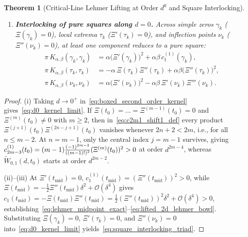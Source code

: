 \documentclass[11pt,reqno]{amsart}
\newtheorem{theorem}{Theorem}[section]
\theoremstyle{definition}
\theoremstyle{remark}
\numberwithin{equation}{section}
\newcommand{\fac}{\mathclose{\mathchar"0021}}
\begin{document}
\begin{theorem}[Critical-Line Lehmer Lifting at Order $d^0$ and Square Interlocking]
\begin{enumerate}[label=\textup{(\roman*)},leftmargin=2.2em]
\begin{equation}
\end{equation}
\item \textbf{Interlocking of pure squares along $d = 0$.} Across simple zeros $\gamma_k$ ($\Xi(\gamma_k) = 0$), local extrema $\tau_k$ ($\Xi'(\tau_k) = 0$), and inflection points $\nu_k$ ($\Xi''(\nu_k) = 0$), at least one component reduces to a pure square:
\begin{equation}\label{eq:square_interlocking_triad}
\begin{aligned}
\pi\,K_{\alpha,\beta}(\gamma_k, \gamma_k) &= \alpha\bigl(\Xi'(\gamma_k)\bigr)^2 + \alpha\beta\,c_1^{(1)}(\gamma_k), \\
\pi\,K_{\alpha,\beta}(\tau_k, \tau_k) &= -\alpha\,\Xi(\tau_k)\Xi''(\tau_k) + \alpha\beta\bigl(\Xi''(\tau_k)\bigr)^2, \\
\pi\,K_{\alpha,\beta}(\nu_k, \nu_k) &= \alpha\bigl(\Xi'(\nu_k)\bigr)^2 - \alpha\beta\,\Xi'(\nu_k)\Xi'''(\nu_k).
\end{aligned}
\end{equation}
\end{enumerate}
\end{theorem}

\begin{proof}
(i) Taking $d \to 0^+$ in~\eqref{eq:boxed_second_order_kernel} gives~\eqref{eq:d0_kernel_limit}. If $\Xi(t_0) = \dots = \Xi^{(m-1)}(t_0) = 0$ and $\Xi^{(m)}(t_0) \neq 0$ with $m \ge 2$, then in~\eqref{eq:c2m1_shift1_def} every product $\Xi^{(j+1)}(t_0)\Xi^{(2n-j+1)}(t_0)$ vanishes whenever $2n + 2 < 2m$, i.e., for all $n \le m - 2$. At $n = m - 1$, only the central index $j = m - 1$ survives, giving $c_{2m-3}^{(1)}(t_0) = (m-1)\frac{(-1)^{2m-2}}{((m-1)\fac)^2}(\Xi^{(m)}(t_0))^2 > 0$ at order $d^{2m-4}$, whereas $\widetilde{W}_{0,1}(d,t_0)$ starts at order $d^{2m-2}$.

(ii)--(iii) At $\Xi'(t_{\mathrm{mid}}) = 0$, $c_1^{(1)}(t_{\mathrm{mid}}) = (\Xi''(t_{\mathrm{mid}}))^2 > 0$, while $\Xi(t_{\mathrm{mid}}) = -\frac{1}{2}\Xi''(t_{\mathrm{mid}})\delta^2 + \mathcal{O}(\delta^4)$ gives $c_1(t_{\mathrm{mid}}) = -\Xi(t_{\mathrm{mid}})\Xi''(t_{\mathrm{mid}}) = \frac{1}{2}(\Xi''(t_{\mathrm{mid}}))^2\delta^2 + \mathcal{O}(\delta^4) > 0$, establishing~\eqref{eq:lehmer_midpoint_exact}--\eqref{eq:lifted_2d_lehmer_bowl}. Substituting $\Xi(\gamma_k)=0$, $\Xi'(\tau_k)=0$, and $\Xi''(\nu_k)=0$ into~\eqref{eq:d0_kernel_limit} yields~\eqref{eq:square_interlocking_triad}.
\end{proof}
\end{document}
